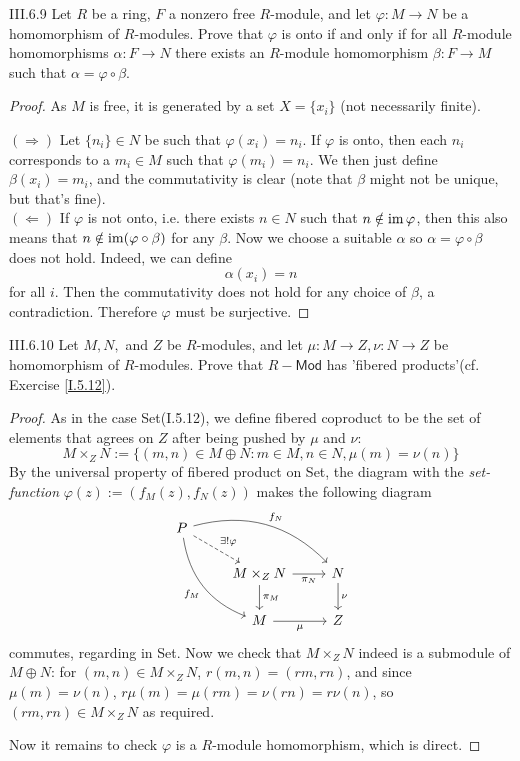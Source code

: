 \begin{problem}{III.6.9}
Let $R$ be a ring, $F$ a nonzero free $R$-module, and let $\varphi: M \to N$ be a homomorphism of $R$-modules. Prove that $\varphi$ is onto if and only if for all $R$-module homomorphisms $\alpha: F \to N$ there exists an $R$-module homomorphism $\beta:F \to M$ such that $\alpha = \varphi \circ \beta$.
\end{problem}
\begin{proof}
As $M$ is free, it is generated by a set $X = \{x_i\}$ (not necessarily finite). 

\noindent $(\Rightarrow)$ Let $\{n_i\} \in N$ be such that $\varphi(x_i) = n_i$. If $\varphi$ is onto, then each $n_i$ corresponds to a $m_i \in M$ such that $\varphi(m_i) = n_i$. We then just define $\beta(x_i) = m_i$, and the commutativity is clear (note that $\beta$ might not be unique, but that's fine). \\
$(\Leftarrow)$ If $\varphi$ is not onto, i.e. there exists $n \in N$ such that $n \notin \operatorname{im} \varphi$, then this also means that $n \notin \operatorname{im} (\varphi \circ \beta)$ for any $\beta$. Now we choose a suitable $\alpha$ so $\alpha = \varphi \circ \beta$ does not hold. Indeed, we can define
\[
\alpha(x_i) = n	
\]
for all $i$. Then the commutativity does not hold for any choice of $\beta$, a contradiction. Therefore $\varphi$ must be surjective.
\end{proof}


\begin{problem}{III.6.10}
Let $M,N,$ and $Z$ be $R$-modules, and let $\mu:M \to Z, \nu:N \to Z$ be homomorphism of $R$-modules. Prove that $R-\mathsf{Mod}$ has 'fibered products'(cf. Exercise \ref{I.5.12}).
\end{problem}
\begin{proof}
As in the case \textsf{Set}(I.5.12), we define fibered coproduct to be  the set of elements that agrees on $Z$ after being pushed by $\mu$ and $\nu$:
\[
M \times_Z N := \{(m,n)\in M \oplus N:m\in M, n \in N, \mu(m) = \nu(n)\}
\]
By the universal property of fibered product on \textsf{Set}, the diagram with the \emph{set-function} $\varphi(z) := (f_M(z),f_N(z))$ makes the following diagram 
\[
\begin{tikzcd}
P \arrow[rd, "\exists!\varphi", dashed] \arrow[rdd, "f_M"', bend right] \arrow[rrd, "f_N", bend left] & & \\
& M \times_Z N \arrow[d, "\pi_M"] \arrow[r, "\pi_N"'] & N \arrow[d, "\nu"] \\
& M \arrow[r, "\mu"']  & Z                    
\end{tikzcd}    
\]
commutes, regarding in \textsf{Set}. Now we check that $M \times_Z N$ indeed is a submodule of $M \oplus N$: for $(m,n) \in M \times_Z N$, $r (m,n) = (rm,rn)$, and since $\mu(m)=\nu(n)$, $r\mu(m) = \mu(rm) = \nu(rn) = r\nu(n)$, so $(rm,rn) \in M \times_Z N$ as required.	

Now it remains to check $\varphi$ is a $R$-module homomorphism, which is direct.
\end{proof}


